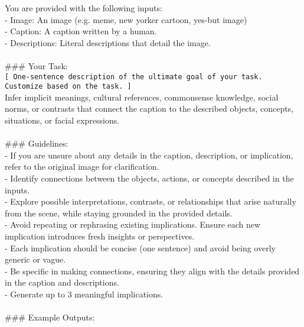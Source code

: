 \begin{figure*}[t]
\small
\begin{tcolorbox}[
    title=Prompt for Seed Implications,
    colback=white,
    colframe=Green,
    arc=0pt,        %
    outer arc=0pt,  %
]

You are provided with the following inputs:\\
- \text{[}Image\text{]}: An image (e.g. meme, new yorker cartoon, yes-but image)\\
- \text{[}Caption\text{]}: A caption written by a human.\\
- \text{[}Descriptions\text{]}: Literal descriptions that detail the image.\\
\\
\#\#\# Your Task:\\
\texttt{[ One-sentence description of the ultimate goal of your task. Customize based on the task. ]}\\
Infer implicit meanings, cultural references, commonsense knowledge, social norms, or contrasts that connect the caption to the described objects, concepts, situations, or facial expressions.\\
\\
\#\#\# Guidelines:\\
- If you are unsure about any details in the caption, description, or implication, refer to the original image for clarification.\\
- Identify connections between the objects, actions, or concepts described in the inputs.\\
- Explore possible interpretations, contrasts, or relationships that arise naturally from the scene, while staying grounded in the provided details.\\
- Avoid repeating or rephrasing existing implications. Ensure each new implication introduces fresh insights or perspectives.\\
- Each implication should be concise (one sentence) and avoid being overly generic or vague.\\
- Be specific in making connections, ensuring they align with the details provided in the caption and descriptions.\\
- Generate up to 3 meaningful implications.\\
\\
\#\#\# Example Outputs:\\

\end{tcolorbox}
\end{figure*}
